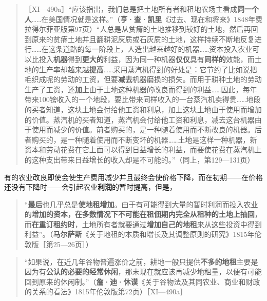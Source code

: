 \begin{quote}{［XI—490a］“应该指出，我们总是把土地所有者和租地农场主看成\textbf{同一个人}……在美国情况就是这样。”（\textbf{亨·查·凯里}《过去、现在和将来》1848年费拉得尔菲亚版第97页）“人总是从贫瘠的土地推移到较好的土地，然后再回到原来的贫瘠土地并且翻耕泥灰质或石灰质的土地，这样持续不断地反复进行……在这条道路的每一阶段上，人造出越来越好的机器……资本投入农业可以比投入\textbf{机器}得到\textbf{更大的}利益，因为同一种机器\textbf{仅仅}具有\textbf{同样的}效能，而土地的生产率却越来越\textbf{提高}……采用蒸汽机得到的好处是：它节约了比如说把毛织成呢的劳动的工资，但要\textbf{减去}机器磨损的损失。而用于耕种土地的劳动生产了工资，还\textbf{加上}由于土地这种机器的改良而得到的利益……因此，每年带来100镑收入的一个地段，要比带来同样收入的一台蒸汽机卖得贵……地段的买者知道，这块土地会付给他工资和利息，加上这块土地由于使用而增加的价值。蒸汽机的买者知道，蒸汽机会付给他工资和利息，减去这台机器由于使用而减少的价值。前者购买的，是一种随着使用而不断改良的机器。后者购买的，是一种随着使用而不断变坏的机器……土地是这样一种机器，新资本和劳动花费在它上面可以得到日益增长的利益，而要使花费在蒸汽机上的这种支出带来日益增长的收入却是不可能的。”（同上，第129—131页）}\end{quote}


有的农业改良即使会使生产费用减少并且最终会使价格下降，而在初期——在价格还没有下降时——会引起农业\textbf{利润}的暂时提高，但是，

\begin{quote}{“\textbf{最后}也几乎总是\textbf{使地租增加}。由于有可能得到大量的暂时利润而投入农业的\textbf{增加的资本，在多数情况下不可能在租佃期内完全从租种的土地上抽回}，而\textbf{在重订租约时}，土地所有者就要通过\textbf{增加自己的地租}来从这些投资中得到利益”。（\textbf{马尔萨斯}《关于地租的本质和增长及其调整原则的研究》1815年伦敦版［第25—26页］）}\end{quote}


\begin{quote}{“如果说，在近几年谷物普遍涨价之前，耕地一般只提供\textbf{不多的地租}主要是因为有\textbf{公认的必要的经常休闲}，那末现在就应该再减少地租量，以便有可能回到原来的休闲制。”（\textbf{詹·迪·休谟}《关于谷物法及其同农业、商业和财政的关系的看法》1815年伦敦版第72页）［XI—490a］}\end{quote}


